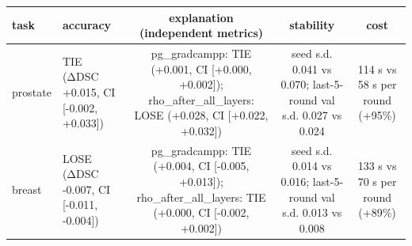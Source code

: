 \begin{tabular}{llccc}
\hline
task & accuracy & explanation (independent metrics) & stability & cost \\
\hline
prostate & TIE (ΔDSC +0.015, CI [-0.002, +0.033]) & pg\_gradcampp: TIE (+0.001, CI [+0.000, +0.002]); rho\_after\_all\_layers: LOSE (+0.028, CI [+0.022, +0.032]) & seed s.d. 0.041 vs 0.070; last-5-round val s.d. 0.027 vs 0.024 & 114 s vs 58 s per round (+95\%) \\
breast & LOSE (ΔDSC -0.007, CI [-0.011, -0.004]) & pg\_gradcampp: TIE (+0.004, CI [-0.005, +0.013]); rho\_after\_all\_layers: TIE (+0.000, CI [-0.002, +0.002]) & seed s.d. 0.014 vs 0.016; last-5-round val s.d. 0.013 vs 0.008 & 133 s vs 70 s per round (+89\%) \\
\hline
\end{tabular}
